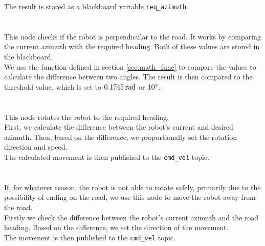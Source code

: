         The result is stored as a blackboard variable \texttt{req\_azimuth}.\\\\
    \\
        This node checks if the robot is perpendicular to the road. It works by comparing the current azimuth with the required heading. Both of these values are stored in the blackboard.\\
        We use the function defined in section \ref{sec:math_func} to compare the values to calculate the difference between two angles. The result is then compared to the threshold value, which is set to $0.1745\:\rm{rad}$ or $10\rm{^{\circ}}$.\\\\
    \\
        This node rotates the robot to the required heading.\\
        First, we calculate the difference between the robot's current and desired azimuth. Then, based on the difference, we proportionally set the rotation direction and speed.\\
        The calculated movement is then published to the \texttt{cmd\_vel} topic.\\\\
    \\
        If, for whatever reason, the robot is not able to rotate safely, primarily due to the possibility of ending on the road, we use this node to move the robot away from the road.\\
        Firstly we check the difference between the robot's current azimuth and the road heading. Based on the difference, we set the direction of the movement.\\
        The movement is then published to the \texttt{cmd\_vel} topic.
